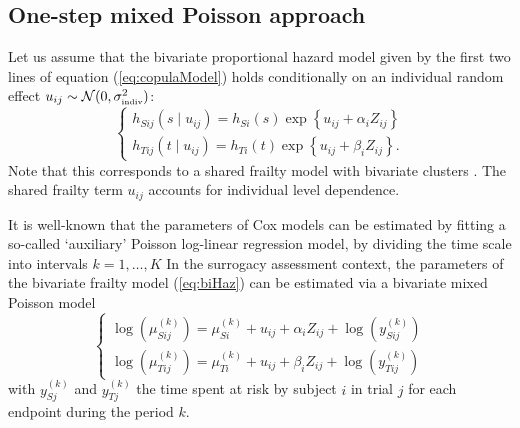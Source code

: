 \documentclass[article,shortnames, nojss]{jss}\usepackage[]{graphicx}\usepackage[]{color}
\begin{document}
\subsection{One-step mixed Poisson approach}

Let us assume that the bivariate proportional hazard model given by the first
two lines of equation (\ref{eq:copulaModel}) holds conditionally
on an individual random effect
$u_{ij} \sim \mathcal N(0, \sigma^2_\text{\tiny indiv})$:
\begin{equation}
\begin{cases}
h_{Sij}(s\mid u_{ij}) = h_{S i}(s)
\exp\left\{u_{ij} + \alpha_i Z_{ij} \right\}\\
h_{Tij}(t\mid u_{ij}) = h_{T i}(t)
\exp\left\{u_{ij} + \beta_i Z_{ij}\right\}.
\end{cases}
\label{eq:biHaz}
\end{equation}
Note that this corresponds to a  shared frailty model with 
bivariate clusters \citep{DuchateauJanssen08}.
The shared frailty term $u_{ij}$ accounts for individual level dependence.

It is well-known \cite[see for instance][]{Whitehead80, crowtherEtal12}
that the parameters of Cox models can be estimated by fitting
a so-called `auxiliary' Poisson log-linear regression model,
by dividing the time scale into intervals $k=1, \ldots, K$
In the surrogacy assessment context,
the parameters of the bivariate frailty model (\ref{eq:biHaz})
can be estimated via a bivariate mixed Poisson model
\begin{equation}
\begin{cases}
\log\left( \mu_{S ij}^{(k)} \right) = 
\mu_{S i}^{(k)}  + u_{ij}
+ \alpha_i Z_{ij}
+ \log\left(y_{S ij}^{(k)} \right)\\
\log\left( \mu_{T ij}^{(k)} \right) = 
\mu_{T i}^{(k)}  + u_{ij}
+ \beta_i Z_{ij}
+ \log\left(y_{T ij}^{(k)} \right)
\end{cases}
\label{eq:biPoiMix}
\end{equation}
with $y_{Sj}^{(k)}$ and $y_{Tj}^{(k)}$ the time spent at risk
by subject $i$ in trial $j$ for each endpoint
during the period $k$.


\end{document}
